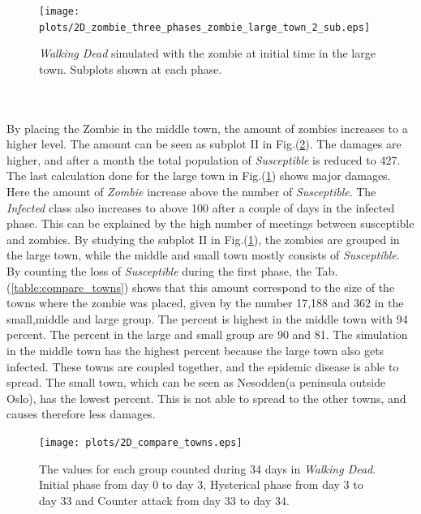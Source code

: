 \documentclass[%
twoside,                 %
final,                   %
10pt]{article}
\begin{document}
\begin{figure}[ht]
  \centerline{\texttt{[image: plots/2D\_zombie\_three\_phases\_zombie\_large\_town\_2\_sub.eps]}}
  \caption{
  \label{fig:large_town} \emph{Walking Dead} simulated with the zombie at initial time in the large town. Subplots shown at each phase.
  }
\end{figure}


\\
\\
By placing the Zombie in the middle town, the amount of zombies increases to a higher level. The amount can be seen as subplot II in Fig.(\ref{fig:compare_towns}). The damages are higher, and after a month the total population of \emph{Susceptible} is reduced to 427. The last calculation done for the large town in Fig.(\ref{fig:large_town}) shows major damages. Here the amount of \emph{Zombie} increase above the number of \emph{Susceptible}. The \emph{Infected} class also increases to above 100 after a couple of days in the infected phase. This can be explained by the high number of meetings between susceptible and zombies. By studying the subplot II in Fig.(\ref{fig:large_town}), the zombies are grouped in the large town, while the middle and small town mostly consists of \emph{Susceptible}. By counting the loss of \emph{Susceptible} during the first phase, the Tab.(\ref{table:compare_towns}) shows that this amount correspond to the size of the towns where the zombie was placed, given by the number 17,188 and 362 in the small,middle and large group. The percent is highest in the middle town with 94 percent. The percent in the large and small group are 90 and 81.  The simulation in the middle town has the highest percent because the large town also gets infected. These towns are coupled together, and the epidemic disease is able to spread. The small town, which can be seen as Nesodden(a peninsula outside Oslo), has the lowest percent. This is not able to spread to the other towns, and causes therefore less damages.  


\begin{figure}[ht]
  \centerline{\texttt{[image: plots/2D\_compare\_towns.eps]}}
  \caption{
  \label{fig:compare_towns} The values for each group counted during 34 days in \emph{Walking Dead}. Initial phase from day 0 to day 3, Hysterical phase from day 3 to day 33 and Counter attack from day 33 to day 34.
  }
\end{figure}
\end{document}
